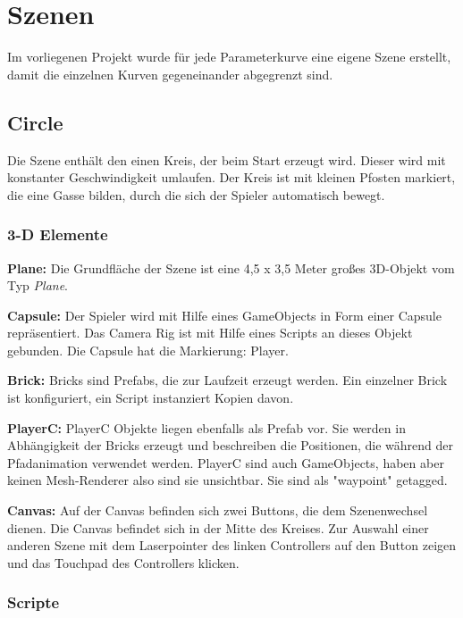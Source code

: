 
\chapter{Szenen}
\label{Szenen}

Im vorliegenen Projekt wurde für jede Parameterkurve eine eigene Szene erstellt, damit die einzelnen Kurven gegeneinander abgegrenzt sind.


\section{Circle}
\label{Kreis}

Die Szene enthält den einen Kreis, der beim Start erzeugt wird. Dieser wird mit konstanter Geschwindigkeit umlaufen. Der Kreis ist mit kleinen Pfosten markiert, die eine Gasse bilden, durch die sich der Spieler automatisch bewegt.

\subsection{3-D Elemente}

\textbf{Plane: } Die Grundfläche der Szene ist eine 4,5 x 3,5 Meter großes 3D-Objekt vom Typ \emph{Plane}.

\textbf{Capsule: } Der Spieler wird mit Hilfe eines GameObjects in Form einer Capsule repräsentiert. Das Camera Rig ist mit Hilfe eines Scripts an dieses Objekt gebunden. Die Capsule hat die Markierung: Player.

\textbf{Brick: } Bricks sind Prefabs, die zur Laufzeit erzeugt werden. Ein einzelner Brick ist konfiguriert, ein Script instanziert Kopien davon.

\textbf{PlayerC: } PlayerC Objekte liegen ebenfalls als Prefab vor. Sie werden in Abhängigkeit der Bricks erzeugt und beschreiben die Positionen, die während der Pfadanimation verwendet werden. PlayerC sind auch GameObjects, haben aber keinen Mesh-Renderer also sind sie unsichtbar. Sie sind als "waypoint" getagged.

\textbf{Canvas: } Auf der Canvas befinden sich zwei Buttons, die dem Szenenwechsel dienen. Die Canvas befindet sich in der Mitte des Kreises. Zur Auswahl einer anderen Szene mit dem Laserpointer des linken Controllers auf den Button zeigen und das Touchpad des Controllers klicken. 


\subsection{Scripte}
\label{Circle_Scripts}

